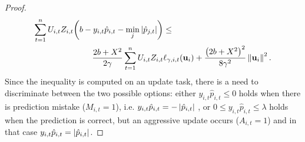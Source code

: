 {\begin{proof}
\begin{equation}
\begin{split}
\sum_{t=1}^{n}U_{i,t}Z_{i,t}{\left({b -y_{i,t}\hat{p}_{i,t}-\min_j{\left\vert{\hat{p}_{j,t}}\right\vert}}\right)}&\le\\
\frac{2b+X^2}{2\gamma}\sum_{t=1}^{n}U_{i,t}Z_{i,t}&\ell_{\gamma,i,t}(\mathbf{u}_i)+\frac{\left({2b+X^2}\right)^2}{8{\gamma}^2}\left\Vert {\mathbf{u}_i} \right\Vert^2.
\label{eq:step_3_in_proof_agressive}
\end{split}
\end{equation}
 Since the inequality is computed on an update task, there is a need to discriminate between   the two possible options: either 
$y_{i,t}\hat{p}_{i,t}\le0$ holds  when there is prediction mistake ($M_{i,t}=1$), i.e. $y_{i,t}\hat{p}_{i,t}=-\left\vert{\hat{p}_{i,t}}\right\vert$  ,  or $0\le y_{i,t}\hat{p}_{i,t}\le\lambda$ holds  when the prediction is correct,  but an aggressive update occurs ($A_{i,t}=1$) and  in that case  $y_{i,t}\hat{p}_{i,t}=\left\vert{\hat{p}_{i,t}}\right\vert$.


\end{proof}}

